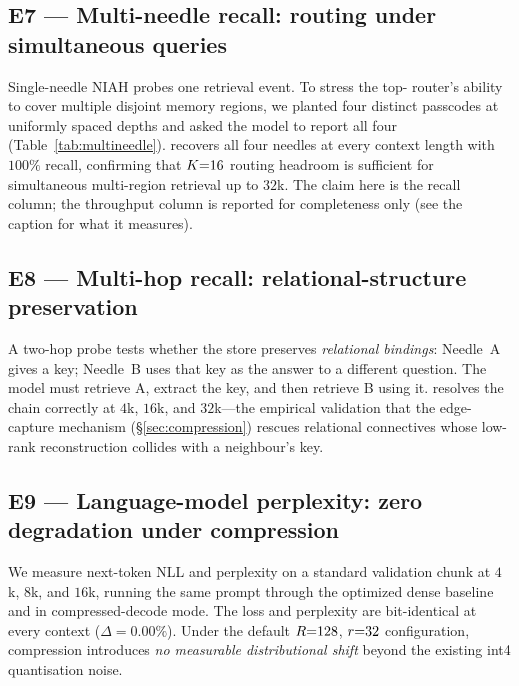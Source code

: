 \subsection{E7 --- Multi-needle recall: routing under simultaneous queries}
\label{sec:e7}
Single-needle NIAH probes one retrieval event. To stress the top-\topk{} router's ability to
cover multiple disjoint memory regions, we planted four distinct passcodes at uniformly spaced
depths and asked the model to report all four (Table~\ref{tab:multineedle}).
\dkv{} recovers all four needles at every context length with $100\%$ recall, confirming that
$K{=}16$ routing headroom is sufficient for simultaneous multi-region retrieval up to $32$k.
The claim here is the recall column; the throughput column is reported for completeness only
(see the caption for what it measures).

\begin{\tabenv}[t]
  \centering
  \caption{Multi-needle recall ($4$ simultaneous passcodes, uniform depths). Recall is exact:
  a needle is counted only if the verbatim passcode appears. Apple~M3, Qwen2.5-1.5B int4.
  \emph{Prompt tok/s} is prompt tokens divided by end-to-end generation wall time, i.e.\ a
  prefill-dominated throughput; it is not the per-token decode throughput of
  Table~\ref{tab:main} and the two should not be compared.}
  \label{tab:multineedle}
  \small
  
\end{\tabenv}

\subsection{E8 --- Multi-hop recall: relational-structure preservation}
A two-hop probe tests whether the store preserves \emph{relational bindings}: Needle~A gives a key;
Needle~B uses that key as the answer to a different question. The model must retrieve A, extract
the key, and then retrieve B using it. \dkv{} resolves the chain correctly at $4$k, $16$k, and
$32$k---the empirical validation that the edge-capture mechanism (\S\ref{sec:compression})
rescues relational connectives whose low-rank reconstruction collides with a neighbour's key.

\subsection{E9 --- Language-model perplexity: zero degradation under compression}
\label{sec:e9}
We measure next-token NLL and perplexity on a standard validation chunk at $4$k, $8$k, and $16$k,
running the same prompt through the optimized dense baseline and \dkv{} in compressed-decode mode.
The loss and perplexity are bit-identical at every context ($\Delta = 0.00\%$). Under the
default $R{=}128$, $r{=}32$ configuration, compression introduces \emph{no measurable
distributional shift} beyond the existing int4 quantisation noise.

